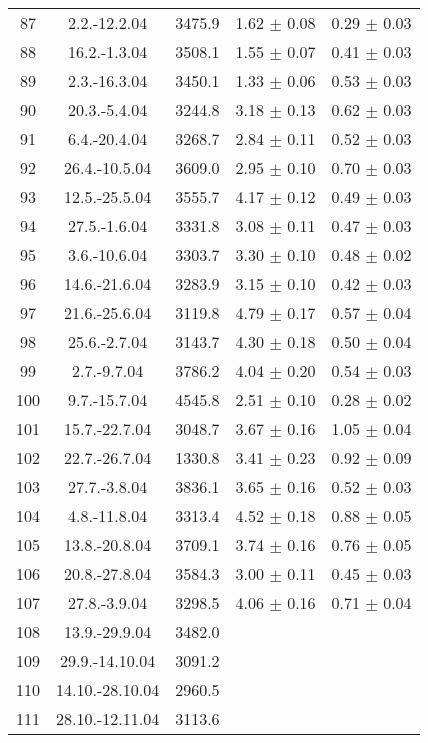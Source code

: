 \documentclass[a4paper,12pt]{article}
\begin{document}
\begin{center}
\begin{longtable}{|c|c|c|c|c|}
    87	&	2.2.-12.2.04	&	3475.9	&	1.62 $\pm$ 0.08	&	0.29 $\pm$ 0.03	\\
    88	&	16.2.-1.3.04	&	3508.1	&	1.55 $\pm$ 0.07	&	0.41 $\pm$ 0.03	\\
    89	&	2.3.-16.3.04	&	3450.1	&	1.33 $\pm$ 0.06	&	0.53 $\pm$ 0.03	\\
    90	&	20.3.-5.4.04	&	3244.8	&	3.18 $\pm$ 0.13	&	0.62 $\pm$ 0.03	\\
    91	&	6.4.-20.4.04	&	3268.7	&	2.84 $\pm$ 0.11	&	0.52 $\pm$ 0.03	\\
    92	&	26.4.-10.5.04	&	3609.0	&	2.95 $\pm$ 0.10	&	0.70 $\pm$ 0.03	\\
    93	&	12.5.-25.5.04	&	3555.7	&	4.17 $\pm$ 0.12	&	0.49 $\pm$ 0.03	\\
    94	&	27.5.-1.6.04	&	3331.8	&	3.08 $\pm$ 0.11	&	0.47 $\pm$ 0.03	\\
    95	&	3.6.-10.6.04	&	3303.7	&	3.30 $\pm$ 0.10	&	0.48 $\pm$ 0.02	\\
    96	&	14.6.-21.6.04	&	3283.9	&	3.15 $\pm$ 0.10	&	0.42 $\pm$ 0.03	\\
    97	&	21.6.-25.6.04	&	3119.8	&	4.79 $\pm$ 0.17	&	0.57 $\pm$ 0.04	\\
    98	&	25.6.-2.7.04	&	3143.7	&	4.30 $\pm$ 0.18	&	0.50 $\pm$ 0.04	\\
    99	&	2.7.-9.7.04	&	3786.2	&	4.04 $\pm$ 0.20	&	0.54 $\pm$ 0.03	\\
    100	&	9.7.-15.7.04	&	4545.8	&	2.51 $\pm$ 0.10	&	0.28 $\pm$ 0.02	\\
    101	&	15.7.-22.7.04	&	3048.7	&	3.67 $\pm$ 0.16	&	1.05 $\pm$ 0.04	\\
    102	&	22.7.-26.7.04	&	1330.8	&	3.41 $\pm$ 0.23	&	0.92 $\pm$ 0.09	\\
    103	&	27.7.-3.8.04	&	3836.1	&	3.65 $\pm$ 0.16	&	0.52 $\pm$ 0.03	\\
    104	&	4.8.-11.8.04	&	3313.4	&	4.52 $\pm$ 0.18	&	0.88 $\pm$ 0.05	\\
    105	&	13.8.-20.8.04	&	3709.1	&	3.74 $\pm$ 0.16	&	0.76 $\pm$ 0.05	\\
    106	&	20.8.-27.8.04	&	3584.3	&	3.00 $\pm$ 0.11	&	0.45 $\pm$ 0.03	\\
    107	&	27.8.-3.9.04	&	3298.5	&	4.06 $\pm$ 0.16	&	0.71 $\pm$ 0.04	\\
    108	&	13.9.-29.9.04	&	3482.0	&		&		\\
    109	&	29.9.-14.10.04	&	3091.2	&		&		\\
    110	&	14.10.-28.10.04	&	2960.5	&		&		\\
    111	&	28.10.-12.11.04	&	3113.6	&		&		\\

\end{longtable}
\end{center}
\end{document}
